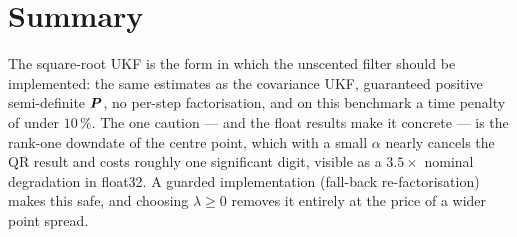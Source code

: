 \section{Summary}
The square-root UKF is the form in which the unscented filter should be implemented: the same
estimates as the covariance UKF, guaranteed positive semi-definite $\bm{P}$, no per-step
factorisation, and on this benchmark a time penalty of under $10\,\%$. The one caution --- and
the float results make it concrete --- is the rank-one downdate of the centre point, which with
a small $\alpha$ nearly cancels the QR result and costs roughly one significant digit,
visible as a $3.5\times$ nominal degradation in float32. A guarded implementation (fall-back
re-factorisation) makes this safe, and choosing $\lambda\ge0$ removes it entirely at the price
of a wider point spread.
